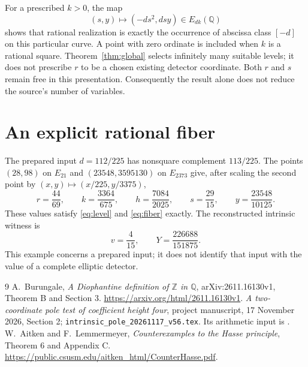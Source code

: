 \documentclass[11pt,a4paper]{article}
\newcommand{\Q}{\mathbb Q}
\begin{document}
For a prescribed $k>0$, the map
\[
(s,y)\longmapsto(-ds^2,dsy)\in E_{dk}(\Q)
\]
shows that rational realization is exactly the occurrence of
abscissa class $[-d]$ on this particular curve. A point with zero
ordinate is included when $k$ is a rational square.
Theorem~\ref{thm:global} selects infinitely many suitable levels;
it does not prescribe $r$ to be a chosen existing detector
coordinate. Both $r$ and $s$ remain free in this presentation.
Consequently the result alone does not reduce the source's
number of variables.

\section*{An explicit rational fiber}

The prepared input $d=112/225$ has nonsquare complement $113/225$.
The points $(28,98)$ on $E_{21}$ and $(23548,3595130)$ on
$E_{2373}$ give, after scaling the second point by
$(x,y)\mapsto(x/225,y/3375)$,
\[
r=\frac{44}{69},\qquad k=\frac{3364}{675},\qquad
h=\frac{7084}{2025},\qquad
s=\frac{29}{15},\qquad y=\frac{23548}{10125}.
\]
These values satisfy \eqref{eq:level} and \eqref{eq:fiber} exactly.
The reconstructed intrinsic witness is
\[
v=\frac4{15},\qquad Y=\frac{226688}{151875}.
\]
This example concerns a prepared input; it does not identify that
input with the value of a complete elliptic detector.

\begin{thebibliography}{9}
A.~Burungale,
\emph{A Diophantine definition of $\mathbb Z$ in $\mathbb Q$},
arXiv:2611.16130v1, Theorem B and Section 3.
\url{https://arxiv.org/html/2611.16130v1}.
\emph{A two-coordinate pole test of coefficient
height four}, project manuscript, 17 November 2026, Section 2;
\texttt{intrinsic\_pole\_20261117\_v56.tex}. Its arithmetic input is \cite{Burungale}.
W.~Aitken and F.~Lemmermeyer,
\emph{Counterexamples to the Hasse principle}, Theorem 6 and Appendix C.
\url{https://public.csusm.edu/aitken_html/CounterHasse.pdf}.
\end{thebibliography}
\end{document}
